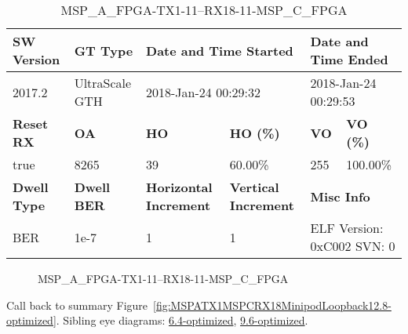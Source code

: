 \begin{table}[h]
\centering
\caption{MSP\_A\_FPGA-TX1-11--RX18-11-MSP\_C\_FPGA}
\label{tab:MSPAFPGATX111RX1811MSPCFPGA12.8-optimized}
\begin{tabular}{@{}|l|l|l|l|l|l|@{}}
\toprule
\textbf{SW Version}                & \textbf{GT Type}   & \multicolumn{2}{l|}{\textbf{Date and Time Started}}            & \multicolumn{2}{l|}{\textbf{Date and Time Ended}}        \\ \midrule
2017.2                       & UltraScale GTH          & \multicolumn{2}{l|}{2018-Jan-24 00:29:32}                   & \multicolumn{2}{l|}{2018-Jan-24 00:29:53}               \\ \midrule
\textbf{Reset RX}                  & \textbf{OA} & \textbf{HO}   & \textbf{HO (\%)} & \textbf{VO} & \textbf{VO (\%)} \\ \midrule
true & 8265        & 39          & 60.00\%        & 255        & 100.00\%       \\ \midrule
\textbf{Dwell Type}                & \textbf{Dwell BER} & \textbf{Horizontal Increment} & \textbf{Vertical Increment}    & \multicolumn{2}{l|}{\textbf{Misc Info}}                  \\ \midrule
BER                            & 1e-7        & 1        & 1           & \multicolumn{2}{l|}{ELF Version: 0xC002 SVN: 0}                         \\ \bottomrule
\end{tabular}
\end{table}

\begin{figure}[h]
\caption{MSP\_A\_FPGA-TX1-11--RX18-11-MSP\_C\_FPGA} \label{fig:MSPAFPGATX111RX1811MSPCFPGA12.8-optimized}
\end{figure}

Call back to summary Figure~\ref{fig:MSPATX1MSPCRX18MinipodLoopback12.8-optimized}.
Sibling eye diagrams: \hyperref[sec:MSPAFPGATX111RX1811MSPCFPGA6.4-optimized]{6.4-optimized}, \hyperref[sec:MSPAFPGATX111RX1811MSPCFPGA9.6-optimized]{9.6-optimized}.

\clearpage
\newpage

